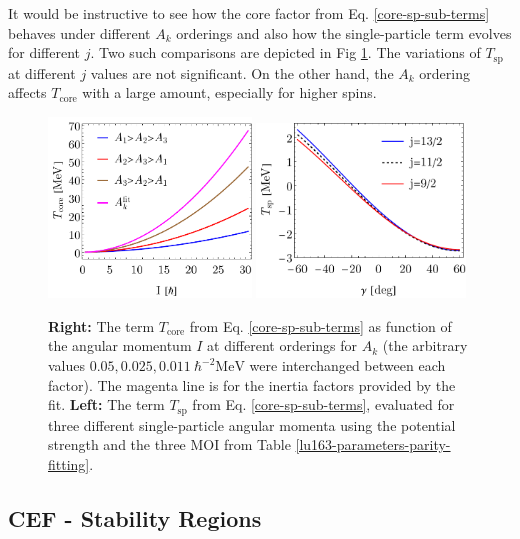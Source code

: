 It would be instructive to see how the core factor from Eq. \ref{core-sp-sub-terms} behaves under different $A_k$ orderings and also how the single-particle term evolves for different $j$. Two such comparisons are depicted in Fig \ref{fig-t-core-sp-terms}. The variations of $T_\text{sp}$ at different $j$ values are not significant. On the other hand, the $A_k$ ordering affects $T_\text{core}$ with a large amount, especially for higher spins.
\begin{figure}
    \centering
    \includegraphics[width=0.48\textwidth]{Chapters/Figures/parity-partners-plots/t-core.pdf}
    \includegraphics[width=0.495\textwidth]{Chapters/Figures/parity-partners-plots/t-sp.pdf}
    \caption{\textbf{Right:} The term $T_\text{core}$ from Eq. \ref{core-sp-sub-terms} as function of the angular momentum $I$ at different orderings for $A_k$ (the arbitrary values $0.05, 0.025, 0.011\ \hbar^{-2}\text{MeV}$ were interchanged between each factor). The magenta line is for the inertia factors provided by the fit. \textbf{Left:} The term $T_\text{sp}$ from Eq. \ref{core-sp-sub-terms}, evaluated for three different single-particle angular momenta using the potential strength and the three MOI from Table \ref{lu163-parameters-parity-fitting}.}
    \label{fig-t-core-sp-terms}
\end{figure}

\subsection{CEF - Stability Regions}

